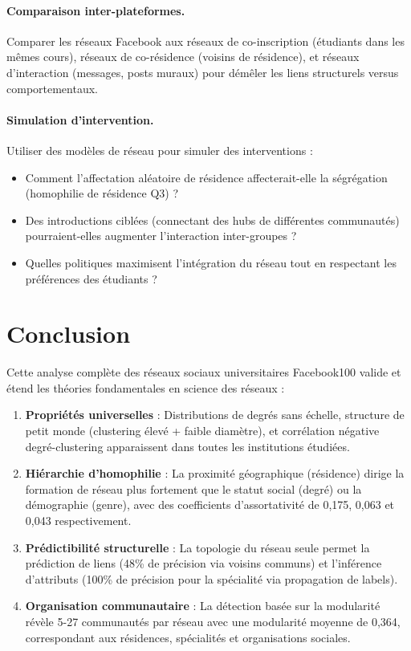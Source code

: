 \documentclass[12pt,a4paper]{article}
\begin{document}
\paragraph{Comparaison inter-plateformes.} Comparer les réseaux Facebook aux réseaux de co-inscription (étudiants dans les mêmes cours), réseaux de co-résidence (voisins de résidence), et réseaux d'interaction (messages, posts muraux) pour démêler les liens structurels versus comportementaux.

\paragraph{Simulation d'intervention.} Utiliser des modèles de réseau pour simuler des interventions :
\begin{itemize}
    \item Comment l'affectation aléatoire de résidence affecterait-elle la ségrégation (homophilie de résidence Q3) ?
    \item Des introductions ciblées (connectant des hubs de différentes communautés) pourraient-elles augmenter l'interaction inter-groupes ?
    \item Quelles politiques maximisent l'intégration du réseau tout en respectant les préférences des étudiants ?
\end{itemize}

\section{Conclusion}

Cette analyse complète des réseaux sociaux universitaires Facebook100 valide et étend les théories fondamentales en science des réseaux :

\begin{enumerate}
    \item \textbf{Propriétés universelles} : Distributions de degrés sans échelle, structure de petit monde (clustering élevé + faible diamètre), et corrélation négative degré-clustering apparaissent dans toutes les institutions étudiées.
    
    \item \textbf{Hiérarchie d'homophilie} : La proximité géographique (résidence) dirige la formation de réseau plus fortement que le statut social (degré) ou la démographie (genre), avec des coefficients d'assortativité de 0,175, 0,063 et 0,043 respectivement.
    
    \item \textbf{Prédictibilité structurelle} : La topologie du réseau seule permet la prédiction de liens (48\% de précision via voisins communs) et l'inférence d'attributs (100\% de précision pour la spécialité via propagation de labels).
    
    \item \textbf{Organisation communautaire} : La détection basée sur la modularité révèle 5-27 communautés par réseau avec une modularité moyenne de 0,364, correspondant aux résidences, spécialités et organisations sociales.
\end{enumerate}
\end{document}
